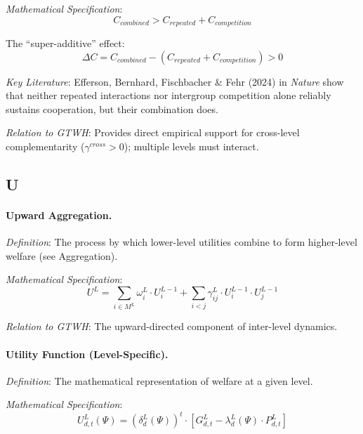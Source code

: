 \documentclass[12pt,a4paper]{article}
\begin{document}
\textit{Mathematical Specification}:
\begin{equation}
C_{combined} > C_{repeated} + C_{competition}
\end{equation}

The ``super-additive'' effect:
\begin{equation}
\Delta C = C_{combined} - (C_{repeated} + C_{competition}) > 0
\end{equation}

\textit{Key Literature}: Efferson, Bernhard, Fischbacher \& Fehr (2024) in 
\textit{Nature} show that neither repeated interactions nor intergroup 
competition alone reliably sustains cooperation, but their combination does.

\textit{Relation to GTWH}: Provides direct empirical support for cross-level 
complementarity ($\gamma^{cross} > 0$); multiple levels must interact.

\subsection*{U}

\paragraph{Upward Aggregation.}
\textit{Definition}: The process by which lower-level utilities combine to 
form higher-level welfare (see Aggregation).

\textit{Mathematical Specification}:
\begin{equation}
U^L = \sum_{i \in M^L} \omega^L_i \cdot U^{L-1}_i + \sum_{i < j} \gamma^L_{ij} \cdot U^{L-1}_i \cdot U^{L-1}_j
\end{equation}

\textit{Relation to GTWH}: The upward-directed component of inter-level dynamics.

\medskip

\paragraph{Utility Function (Level-Specific).}
\textit{Definition}: The mathematical representation of welfare at a given level.

\textit{Mathematical Specification}:
\begin{equation}
U^L_{d,t}(\Psi) = \left(\delta^L_d(\Psi)\right)^t \cdot \left[G^L_{d,t} - \lambda^L_d(\Psi) \cdot P^L_{d,t}\right]
\end{equation}
\end{document}
